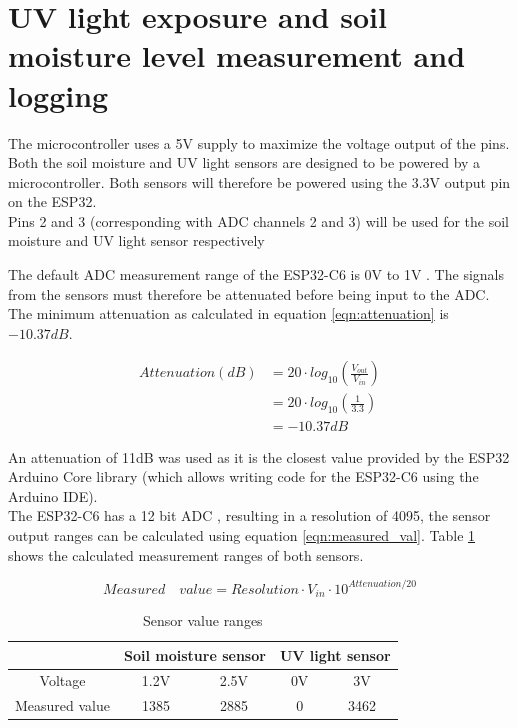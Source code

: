\section{UV light exposure and soil moisture level measurement and logging}

The microcontroller uses a 5V supply to maximize the voltage output of the pins.
\\


Both the soil moisture and UV light sensors are designed to be powered by a microcontroller. Both sensors will therefore be powered using the 3.3V output pin on the ESP32. 
\\
Pins 2 and 3 (corresponding with ADC channels 2 and 3) will be used for the soil moisture and UV light sensor respectively

The default ADC measurement range of the ESP32-C6 is 0V to 1V \cite{esp_datasheet} \cite{esp_github}. The signals from the sensors must therefore be attenuated before being input to the ADC. The minimum attenuation as calculated in equation \ref{eqn:attenuation} \cite{attenuation_formula} is \(-10.37 dB\).

\begin{equation}
\label{eqn:attenuation}
\begin{split}
    Attenuation  (dB) & = 20 \cdot log_{10}\left ( \frac{V_{out}}{V_{in}} \right ) \\ 
    & = 20 \cdot log_{10}\left ( \frac{1}{3.3} \right ) \\ 
    & = -10.37 dB
\end{split}
\end{equation}

An attenuation of 11dB was used as it is the closest value provided by the ESP32 Arduino Core library \cite{esp_arduino_github} (which allows writing code for the ESP32-C6 using the Arduino IDE). 
\\
The ESP32-C6 has a 12 bit ADC \cite{esp_tech_ref}, resulting in a resolution of 4095, the sensor output ranges can be calculated using equation \ref{eqn:measured_val}. Table \ref{tab:sensor_ranges} shows the calculated measurement ranges of both sensors.

\begin{equation}
\label{eqn:measured_val}
    Measured \quad value = Resolution \cdot V_{in} \cdot 10^{Attenuation / 20}
\end{equation}

\begin{table}[!h]
    \centering
    \begin{tabular}{|c|cc|cc|}
    \hline
         & \multicolumn{2}{c||}{Soil moisture sensor} & \multicolumn{2}{c|}{UV light sensor} \\
        \hline
        Voltage & 1.2V & 2.5V & 0V & 3V \\
        Measured value & 1385 & 2885 & 0 & 3462\\
        \hline
    \end{tabular}
    \caption{Sensor value ranges}
    \label{tab:sensor_ranges}
\end{table}

